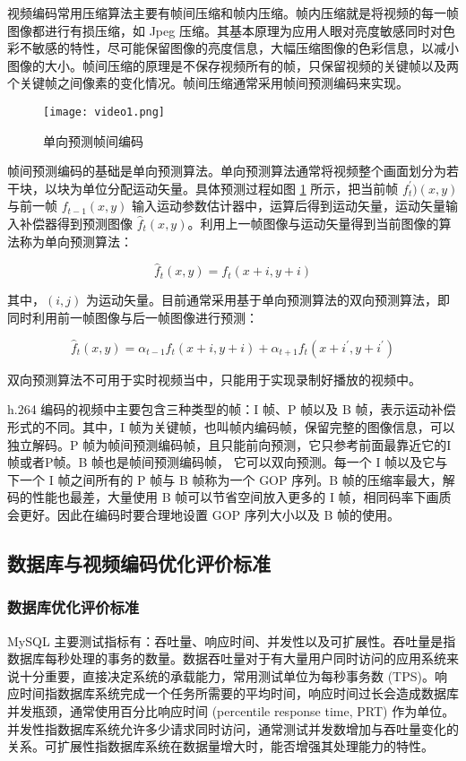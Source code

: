 视频编码常用压缩算法主要有帧间压缩和帧内压缩。帧内压缩就是将视频的每一帧图像都进行有损压缩，如 Jpeg 压缩。其基本原理为应用人眼对亮度敏感同时对色彩不敏感的特性，尽可能保留图像的亮度信息，大幅压缩图像的色彩信息，以减小图像的大小。帧间压缩的原理是不保存视频所有的帧，只保留视频的关键帧以及两个关键帧之间像素的变化情况。帧间压缩通常采用帧间预测编码来实现。

\begin{figure}[!ht]
    \centering
    \texttt{[image: video1.png]}
    \caption{单向预测帧间编码}
    \label{fig:video1}
\end{figure}

帧间预测编码的基础是单向预测算法。单向预测算法通常将视频整个画面划分为若干块，以块为单位分配运动矢量。具体预测过程如图 \ref{fig:video1} 所示，把当前帧 $f_{t}^{'})(x,y) $ 与前一帧 $f_{t-1}(x,y)$ 输入运动参数估计器中，运算后得到运动矢量，运动矢量输入补偿器得到预测图像 $\hat{f}_{t}(x,y)$。利用上一帧图像与运动矢量得到当前图像的算法称为单向预测算法：

\begin{equation}
\label{eq:forward_pre}
\hat{f}_{t}(x,y) = f_{t}(x+i, y+i)
\end{equation}

其中，$(i, j)$ 为运动矢量。目前通常采用基于单向预测算法的双向预测算法，即同时利用前一帧图像与后一帧图像进行预测：

\begin{equation}
\label{eq:forward_back_pre}
\hat{f}_{t}(x,y) = \alpha_{t-1}f_{t}(x+i, y+i) + \alpha_{t+1}f_{t}(x+i^{'}, y+i^{'})
\end{equation}

双向预测算法不可用于实时视频当中，只能用于实现录制好播放的视频中。

h.264 编码的视频中主要包含三种类型的帧：I 帧、P 帧以及 B 帧，表示运动补偿形式的不同。其中，I 帧为关键帧，也叫帧内编码帧，保留完整的图像信息，可以独立解码。P 帧为帧间预测编码帧，且只能前向预测，它只参考前面最靠近它的I帧或者P帧。B 帧也是帧间预测编码帧， 它可以双向预测。每一个 I 帧以及它与下一个 I 帧之间所有的 P 帧与 B 帧称为一个 GOP 序列。B 帧的压缩率最大，解码的性能也最差，大量使用 B 帧可以节省空间放入更多的 I 帧，相同码率下画质会更好。因此在编码时要合理地设置 GOP 序列大小以及 B 帧的使用。

\subsection{数据库与视频编码优化评价标准}
\subsubsection{数据库优化评价标准}
MySQL 主要测试指标有：吞吐量、响应时间、并发性以及可扩展性。吞吐量是指数据库每秒处理的事务的数量。数据吞吐量对于有大量用户同时访问的应用系统来说十分重要，直接决定系统的承载能力，常用测试单位为每秒事务数 (TPS)。响应时间指数据库系统完成一个任务所需要的平均时间，响应时间过长会造成数据库并发瓶颈，通常使用百分比响应时间 (percentile response time, PRT) 作为单位。并发性指数据库系统允许多少请求同时访问，通常测试并发数增加与吞吐量变化的关系。可扩展性指数据库系统在数据量增大时，能否增强其处理能力的特性。


